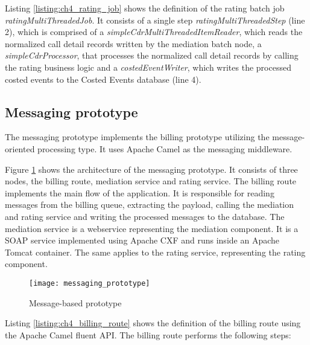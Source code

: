 Listing \ref{listing:ch4_rating_job} shows the definition of the rating batch job \emph{ratingMultiThreadedJob}. It consists of a single step \emph{ratingMultiThreadedStep} (line 2), which is comprised of a \emph{simpleCdrMultiThreadedItemReader}, which reads the normalized call detail records written by the mediation batch node, a \emph{simpleCdrProcessor}, that processes the normalized call detail records by calling the rating business logic and a \emph{costedEventWriter}, which writes the processed costed events to the Costed Events database (line 4).



\subsection{Messaging prototype}

The messaging prototype implements the billing prototype utilizing the message-oriented processing type. It uses Apache Camel \citep{apachecamel} as the messaging middleware.

Figure \ref{fig:ch4_messaging_prototype} shows the architecture of the messaging prototype. It consists of three nodes, the billing route, mediation service and rating service. The billing route implements the main flow of the application. It is responsible for reading messages from the billing queue, extracting the payload, calling the mediation and rating service and writing the processed messages to the database. The mediation service is a webservice representing the mediation component. It is a SOAP service implemented using Apache CXF and runs inside an Apache Tomcat container. The same applies to the rating service, representing the rating component.

\begin{figure}[htbp]
	\centering
	\texttt{[image: messaging\_prototype]}
	\caption{Message-based prototype}
	\label{fig:ch4_messaging_prototype}
\end{figure}

Listing \ref{listing:ch4_billing_route} shows the definition of the billing route using the Apache Camel fluent \ac{API}.
The billing route performs the following steps:

